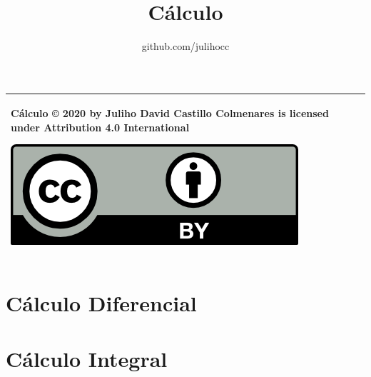 \documentclass{tufte-book}
\title{Cálculo}
\author{github.com/julihocc}
\begin{document}
	\maketitle
\begin{tabular}{|p{}|}
	\hline
Cálculo © 2020 by Juliho David Castillo Colmenares is licensed under Attribution 4.0 International
	\begin{center}
		\includegraphics[scale=1]{./licencia/by.png}
	\end{center}\\
	\hline
\end{tabular}
\tableofcontents

\chapter{Cálculo Diferencial}









\chapter{Cálculo Integral}








\end{document}
